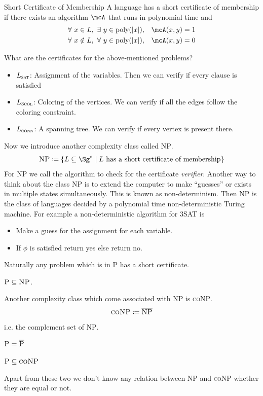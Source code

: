 \begin{Definition}{Short Certificate of Membership}{}
    A language has a short certificate of membership if there exists an algorithm $\mcA$ that runs in polynomial time and \begin{align*}
        \forall\ x\in L,\ \exs\ y\in \text{poly}(|x|),       & \quad \mcA(x,y)=1  \\
        \forall\ x\notin L,\ \forall\ y\in \text{poly}(|x|), & \quad  \mcA(x,y)=0
    \end{align*}
\end{Definition}
What are the certificates for the above-mentioned problems?   \begin{itemize}
    \item $L_{\textsc{sat}}$: Assignment of the variables. Then we can verify if every clause is satisfied
    \item $L_{\textsc{3col}}$: Coloring of the vertices. We can verify if all the edges follow the coloring constraint.
    \item $L_{\textsc{conn}}$: A spanning tree. We can verify if every vertex is present there.
\end{itemize}

Now we introduce another complexity class called \textsc{NP}. $$\textsc{NP}\coloneqq \{L\subseteq \Sg^*\mid L\text{ has a short certificate of membership}\}$$For \textsc{NP} we call the algorithm to check for the certificate \emph{verifier}.  Another way to think about the class \textsc{NP} is to extend the computer to make ``guesses'' or exists in multiple states simultaneously. This is known as non-determinism. Then \textsc{NP} is the class of languages decided by a polynomial time non-deterministic Turing machine. For example a non-deterministic algorithm for \textsc{3SAT} is \begin{itemize}
    \item Make a guess for the assignment for each variable.
    \item If $\phi$ is satisfied return yes else return no.
\end{itemize}\parinf Naturally any problem which is in \textsc{P} has a short certificate. \begin{Theorem}{}{}
    $\textsc{P}\subseteq \textsc{NP}$.
\end{Theorem}\parinn
Another complexity class which come associated with \textsc{NP} is \textsc{coNP}. $$\textsc{coNP}\coloneqq \overline{\textsc{NP}}$$i.e. the complement set of \textsc{NP}.
\begin{observation}
    $\textsc{P}=\overline{\textsc{P}}$
\end{observation}
\begin{Theorem}{}{}
    $\textsc{P}\subseteq \textsc{coNP}$
\end{Theorem}
Apart from these two we don't know any relation between \textsc{NP} and \textsc{coNP} whether they are equal or not.
